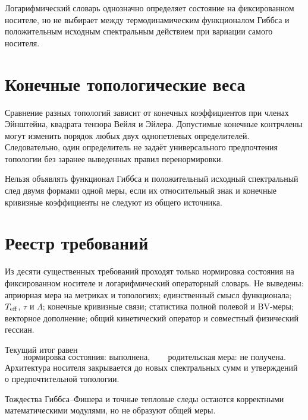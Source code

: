 \begin{theorem}
Логарифмический словарь однозначно определяет состояние на фиксированном
носителе, но не выбирает между термодинамическим функционалом Гиббса и
положительным исходным спектральным действием при вариации самого носителя.
\end{theorem}

\section{Конечные топологические веса}

Сравнение разных топологий зависит от конечных коэффициентов при членах
Эйнштейна, квадрата тензора Вейля и Эйлера. Допустимые конечные контрчлены
могут изменить порядок любых двух однопетлевых определителей. Следовательно,
один определитель не задаёт универсального предпочтения топологии без
заранее выведенных правил перенормировки.

\begin{nogocriterion}
Нельзя объявлять функционал Гиббса и положительный исходный спектральный
след двумя формами одной меры, если их относительный знак и конечные
кривизные коэффициенты не следуют из общего источника.
\end{nogocriterion}

\section{Реестр требований}

Из десяти существенных требований проходят только нормировка состояния на
фиксированном носителе и логарифмический операторный словарь. Не выведены:
априорная мера на метриках и топологиях; единственный смысл функционала;
\(T_{\rm eff}\), \(\tau\) и \(\Lambda\); конечные кривизные связи;
статистика полной полевой и BV-меры; векторное дополнение; общий
кинетический оператор и совместный физический гессиан.

\begin{theorem}
Текущий итог равен
\begin{equation}
 \text{нормировка состояния: выполнена},\qquad
 \text{родительская мера: не получена}.
\end{equation}
Архитектура носителя закрывается до новых спектральных сумм и утверждений о
предпочтительной топологии.
\end{theorem}

Тождества Гиббса--Фишера и точные тепловые следы остаются корректными
математическими модулями, но не образуют общей меры.

